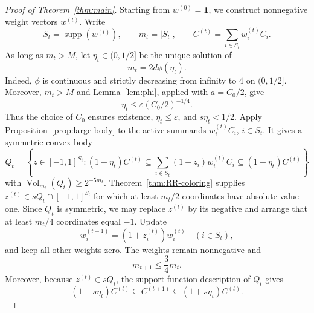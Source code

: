 \documentclass[11pt]{article}
\theoremstyle{remark}
\newcommand{\Vol}{\operatorname{Vol}}
\newcommand{\supp}{\operatorname{supp}}
\newcommand{\eps}{\varepsilon}
\newcommand{\one}{\bm{1}}
\begin{document}
\begin{proof}[Proof of Theorem~\ref{thm:main}]
Starting from $w^{(0)}=\one$, we construct nonnegative weight vectors
$w^{(t)}$.  Write
\[
  S_t=\supp(w^{(t)}),\qquad m_t=|S_t|,
  \qquad C^{(t)}=\sum_{i\in S_t}w_i^{(t)}C_i.
\]
As long as $m_t>M$, let $\eta_t\in(0,1/2]$ be the unique solution of
\begin{equation}\label{eq:eta-definition}
  m_t=2d\phi(\eta_t).
\end{equation}
Indeed, $\phi$ is continuous and strictly decreasing from infinity to
$4$ on $(0,1/2]$.  Moreover, $m_t>M$ and Lemma~\ref{lem:phi}, applied
with $a=C_0/2$, give
\[
  \eta_t\leq\eps(C_0/2)^{-1/4}.
\]
Thus the choice of $C_0$ ensures existence, $\eta_t\leq\eps$, and
$s\eta_t<1/2$.  Apply
Proposition~\ref{prop:large-body} to the active summands
$w_i^{(t)}C_i$, $i\in S_t$.  It gives a symmetric convex body
\[
  Q_t=\left\{z\in[-1,1]^{S_t}:
  (1-\eta_t)C^{(t)}
  \subseteq\sum_{i\in S_t}(1+z_i)w_i^{(t)}C_i
  \subseteq(1+\eta_t)C^{(t)}\right\}
\]
with $\Vol_{m_t}(Q_t)\geq2^{-5m_t}$.
Theorem~\ref{thm:RR-coloring} supplies
$z^{(t)}\in sQ_t\cap[-1,1]^{S_t}$ for which at least $m_t/2$
coordinates have absolute value one.  Since $Q_t$ is symmetric, we
may replace $z^{(t)}$ by its negative and arrange that at least
$m_t/4$ coordinates equal $-1$.  Update
\[
  w_i^{(t+1)}=(1+z_i^{(t)})w_i^{(t)}
  \quad(i\in S_t),
\]
and keep all other weights zero.  The weights remain nonnegative and
\begin{equation}\label{eq:support-shrink}
  m_{t+1}\leq\frac34m_t.
\end{equation}
Moreover, because $z^{(t)}\in sQ_t$, the support-function description
of $Q_t$ gives
\begin{equation}\label{eq:one-step-error}
  (1-s\eta_t)C^{(t)}\subseteq C^{(t+1)}
  \subseteq(1+s\eta_t)C^{(t)}.
\end{equation}


\end{proof}
\end{document}
